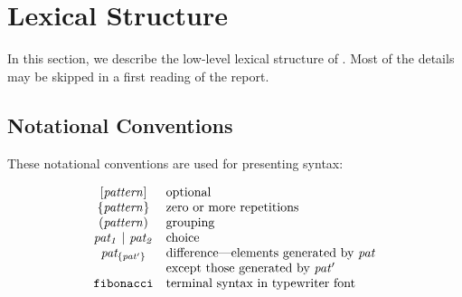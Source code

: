 %
%
\section{Lexical Structure}
\label{lexical-structure}



\noindent
In this section, 
we describe the low-level lexical structure of \Haskell{}.
Most of the details may be skipped in a first reading of
the report.

\subsection{Notational Conventions}
\label{notational-conventions}

These notational conventions are used for presenting syntax:

\[\ba{cl}
\mbox{$\it [pattern]$}             & \tr{optional} \\
\mbox{$\it \{pattern\}$}           & \tr{zero or more repetitions} \\
\mbox{$\it (pattern)$}             & \tr{grouping} \\
\mbox{$\it pat_1\ |\ pat_2$}         & \tr{choice} \\
\mbox{$\it pat_{\{pat'\}}$}        & \tr{difference---elements generated by \mbox{$\it pat$}} \\
                        & \tr{except those generated by \mbox{$\it pat'$}} \\
\mbox{$\it \makebox{\tt fibonacci}$}           & \tr{terminal syntax in typewriter font}
\ea\]

